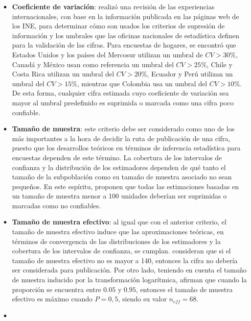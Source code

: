 \documentclass[
  12pt,
  spanish,
]{book}
\providecommand{\tightlist}{%
  \setlength{\itemsep}{0pt}\setlength{\parskip}{0pt}}
\begin{document}
\begin{itemize}
\tightlist
\item
  \textbf{Coeficiente de variación}: \citet{CepalSAe2018} realizó una revisión de las experiencias internacionales, con base en la información publicada en las páginas web de los INE, para determinar cómo son usados los criterios de supresión de información y los umbrales que las oficinas nacionales de estadística definen para la validación de las cifras. Para encuestas de hogares, se encontró que Estados Unidos y los países del Mercosur utilizan un umbral de \(CV > 30\%\), Canadá y México usan como referencia un umbral del \(CV > 25\%\), Chile y Costa Rica utilizan un umbral del \(CV > 20\%\), Ecuador y Perú utilizan un umbral del \(CV > 15\%\), mientras que Colombia usa un umbral del \(CV > 10\%\). De esta forma, cualquier cifra estimada cuyo coeficiente de variación sea mayor al umbral predefinido es suprimida o marcada como una cifra poco confiable.
\item
  \textbf{Tamaño de muestra}: este criterio debe ser considerado como uno de los más importantes a la hora de decidir la ruta de publicación de una cifra, puesto que los desarrollos teóricos en términos de inferencia estadística para encuestas dependen de este término. La cobertura de los intervalos de confianza y la distribución de los estimadores dependen de qué tanto el tamaño de la subpoblación como su tamaño de muestra asociado no sean pequeños. En este espíritu, \citet{Barnett_Walker_Chromy_Davis_Emrich_Odom_Packer_2003} proponen que todas las estimaciones basadas en un tamaño de muestra menor a 100 unidades deberían ser suprimidas o marcadas como no confiables.
\item
  \textbf{Tamaño de muestra efectivo}: al igual que con el anterior criterio, el tamaño de muestra efectivo induce que las aproximaciones teóricas, en términos de convergencia de las distribuciones de los estimadores y la cobertura de los intervalos de confianza, se cumplan. \citet{Hornik_Maklan_Cadell_Prado_Barmada_Jacobsohn_Orwin_Sridharan_Zador_Southwell_etal} consideran que si el tamaño de muestra efectivo no es mayor a 140, entonces la cifra no debería ser considerada para publicación. Por otro lado, teniendo en cuenta el tamaño de muestra inducido por la transformación logarítmica, \citet{Barnett_Walker_Chromy_Davis_Emrich_Odom_Packer_2003} afirman que cuando la proporción se encuentra entre \(0.05\) y \(0.95\), entonces el tamaño de muestra efectivo es máximo cuando \(P = 0,5\), siendo su valor \(n_{eff} = 68\).
\item

\end{itemize}
\end{document}
